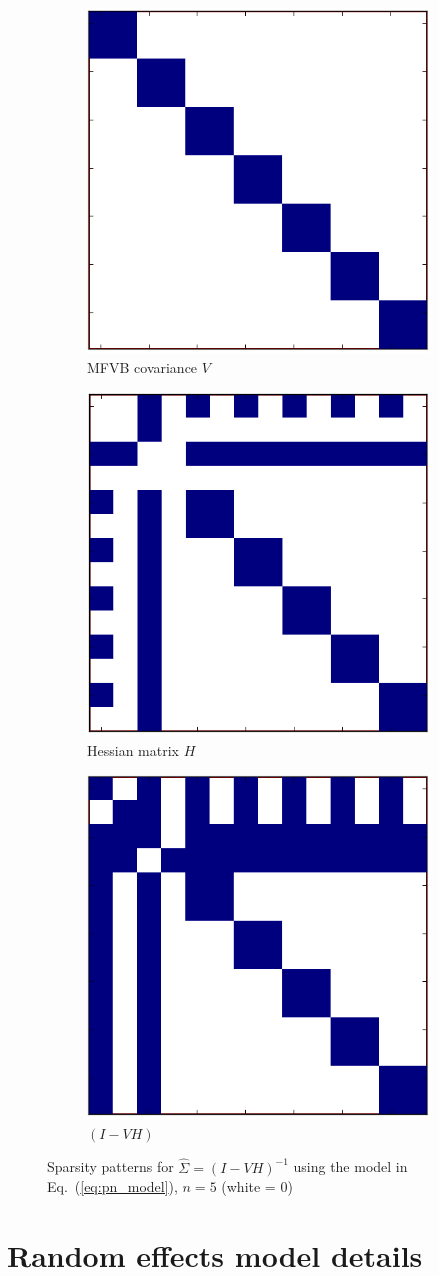 \documentclass{article}\usepackage[]{graphicx}\usepackage[]{color}
\newcommand{\eq}[1]{Eq.~(\ref{eq:#1})}
\newcommand{\truecov}{\Sigma} %
\begin{document}
\begin{figure}[ht!]
  \centering
  \begin{subfigure}{0.3\linewidth}
    \centering
    \includegraphics[height=0.3 \linewidth]{./cov_modified.png}
    \caption{\label{fig:V_sparse} MFVB covariance $V$}
  \end{subfigure}
  \begin{subfigure}{0.3\linewidth}
    \centering
    \includegraphics[height=0.3 \linewidth]{./hessian_modified.png}
    \caption{\label{fig:H_sparse} Hessian matrix $H$}
  \end{subfigure}
  \begin{subfigure}{0.3\linewidth}
    \centering
    \includegraphics[height=0.3 \linewidth]{./lrvb_modified.png}
    \caption{\label{fig:IVH_sparse} \mbox{$(I - VH)$}}
  \end{subfigure}
  \caption{Sparsity patterns for $\hat\truecov = (I - VH)^{-1}$ using the model in \eq{pn_model}, $n = 5$ (white = 0)}
  \label{fig:sparsity_patterns}
\end{figure}



\section{Random effects model details} \label{app:re_details}
\end{document}
